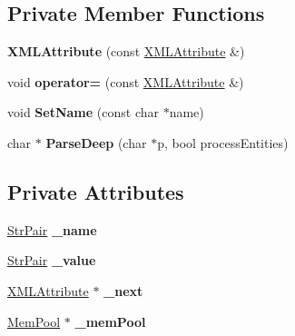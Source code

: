 \subsection*{Private Member Functions}
\begin{DoxyCompactItemize}
\item 
\hypertarget{classtinyxml2_1_1_x_m_l_attribute_a423410d8fb1b94f4514e34abf5432457}{}{\bfseries X\+M\+L\+Attribute} (const \hyperlink{classtinyxml2_1_1_x_m_l_attribute}{X\+M\+L\+Attribute} \&)\label{classtinyxml2_1_1_x_m_l_attribute_a423410d8fb1b94f4514e34abf5432457}

\item 
\hypertarget{classtinyxml2_1_1_x_m_l_attribute_a38e1d174a975bab27a70b4032e39a257}{}void {\bfseries operator=} (const \hyperlink{classtinyxml2_1_1_x_m_l_attribute}{X\+M\+L\+Attribute} \&)\label{classtinyxml2_1_1_x_m_l_attribute_a38e1d174a975bab27a70b4032e39a257}

\item 
\hypertarget{classtinyxml2_1_1_x_m_l_attribute_a469c2363600007f49e62a8048a362d57}{}void {\bfseries Set\+Name} (const char $\ast$name)\label{classtinyxml2_1_1_x_m_l_attribute_a469c2363600007f49e62a8048a362d57}

\item 
\hypertarget{classtinyxml2_1_1_x_m_l_attribute_a44ffae60efcd2c97960f11bb5e3f9a32}{}char $\ast$ {\bfseries Parse\+Deep} (char $\ast$p, bool process\+Entities)\label{classtinyxml2_1_1_x_m_l_attribute_a44ffae60efcd2c97960f11bb5e3f9a32}

\end{DoxyCompactItemize}
\subsection*{Private Attributes}
\begin{DoxyCompactItemize}
\item 
\hypertarget{classtinyxml2_1_1_x_m_l_attribute_a80850208963b536e9254a7fa1d4abe67}{}\hyperlink{classtinyxml2_1_1_str_pair}{Str\+Pair} {\bfseries \+\_\+name}\label{classtinyxml2_1_1_x_m_l_attribute_a80850208963b536e9254a7fa1d4abe67}

\item 
\hypertarget{classtinyxml2_1_1_x_m_l_attribute_abcf5c9b7f040ed71ed2a66557584b5b0}{}\hyperlink{classtinyxml2_1_1_str_pair}{Str\+Pair} {\bfseries \+\_\+value}\label{classtinyxml2_1_1_x_m_l_attribute_abcf5c9b7f040ed71ed2a66557584b5b0}

\item 
\hypertarget{classtinyxml2_1_1_x_m_l_attribute_a3bbf00f77131a8e83d648d32d090c564}{}\hyperlink{classtinyxml2_1_1_x_m_l_attribute}{X\+M\+L\+Attribute} $\ast$ {\bfseries \+\_\+next}\label{classtinyxml2_1_1_x_m_l_attribute_a3bbf00f77131a8e83d648d32d090c564}

\item 
\hypertarget{classtinyxml2_1_1_x_m_l_attribute_ac0a1130568dd9e985dd7753ae44fcdbf}{}\hyperlink{classtinyxml2_1_1_mem_pool}{Mem\+Pool} $\ast$ {\bfseries \+\_\+mem\+Pool}\label{classtinyxml2_1_1_x_m_l_attribute_ac0a1130568dd9e985dd7753ae44fcdbf}

\end{DoxyCompactItemize}
